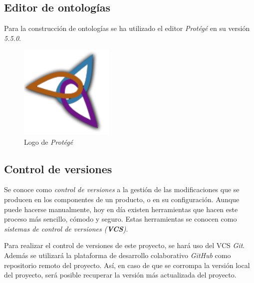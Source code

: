 \subsection{Editor de ontologías}
\label{Editor_ontologias}
Para la construcción de ontologías se ha utilizado el editor 
\textit{Protégé} en su versión \textit{5.5.0}.

\begin{figure}[H]
    \centering
    \begin{minipage}{0.38\textwidth}
        \centering
        \includegraphics[width=0.4\textwidth]{Figures/Logo_Protege.pdf}
        \caption{Logo de \textit{Protégé}}
    \end{minipage}
\end{figure}

\subsection{Control de versiones}
Se conoce como \textit{control de versiones} a la gestión de las modificaciones que se producen en los componentes de un producto, o en 
su configuración. Aunque puede hacerse manualmente, hoy en día existen herramientas que hacen este proceso más sencillo, cómodo y 
seguro. Estas herramientas se conocen como \textit{sistemas de control de versiones (\textbf{VCS})}.\medskip

Para realizar el control de versiones de este proyecto, se hará uso del VCS \textit{Git}. Además se utilizará la 
plataforma de desarrollo colaborativo \textit{GitHub} como repositorio remoto del proyecto. Así, en caso de que 
se corrompa la versión local del proyecto, será posible recuperar la versión más actualizada del proyecto.

